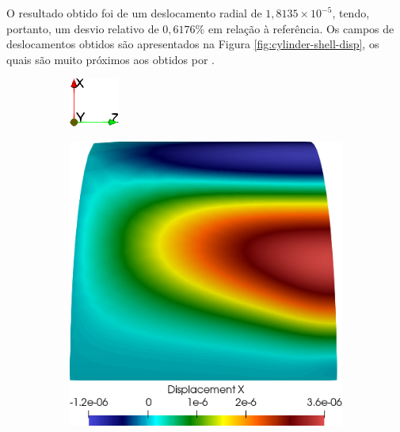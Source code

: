 O resultado obtido foi de um deslocamento radial de $1,8135\times10^{-5}$, tendo, portanto, um desvio relativo de $0,6176\%$ em relação à referência. Os campos de deslocamentos obtidos são apresentados na Figura \ref{fig:cylinder-shell-disp}, os quais são muito próximos aos obtidos por .

\begin{figure}[h!]
    \centering
    \caption{Campos de deslocamentos obtido na simulação de cilindro.}
    \begin{subfigure}{0.075\textwidth}
        \includegraphics[width=\linewidth]{Figuras/cylinder-shell/eixos.png}
    \end{subfigure}
    \begin{subfigure}{0.3\textwidth}
        \includegraphics[width=\linewidth]{Figuras/cylinder-shell/ux.png}

\end{subfigure}
\end{figure}
